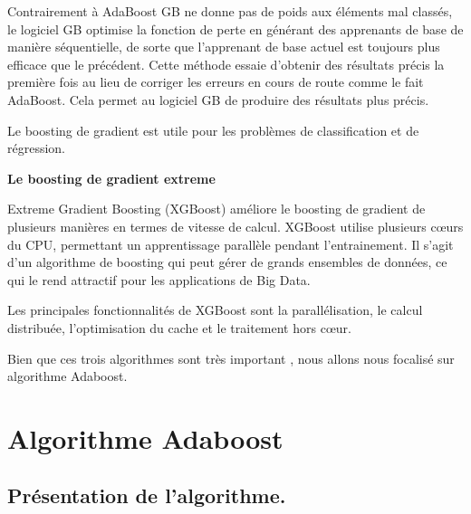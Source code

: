 \documentclass[french,a4paper,12pt]{article}
\begin{document}
\quad Contrairement à AdaBoost  GB ne donne pas de poids aux éléments mal classés,  le logiciel GB optimise la fonction de perte en générant des apprenants de base de manière séquentielle, de sorte que l'apprenant de base actuel est toujours plus efficace que le précédent. Cette méthode essaie d'obtenir des résultats précis la première fois au lieu de corriger les erreurs en cours de route comme le fait AdaBoost\citep{educa}. Cela permet au logiciel GB de produire des résultats plus précis.

\quad Le boosting de gradient est utile pour les problèmes de classification et de régression.




\textbf{Le boosting de gradient extreme}

\quad Extreme Gradient Boosting (XGBoost) améliore le boosting  de gradient de plusieurs manières en termes de vitesse de calcul\citep{mousa}. XGBoost utilise plusieurs cœurs du CPU, permettant un apprentissage parallèle pendant l’entrainement. Il s'agit d'un algorithme de boosting qui peut gérer de grands ensembles de données, ce qui le rend attractif pour les applications de Big Data. 

\quad Les principales fonctionnalités de XGBoost sont la parallélisation, le calcul distribuée, l'optimisation du cache et le traitement hors cœur.

\quad \quad Bien que ces trois algorithmes sont très important , nous allons nous focalisé sur algorithme Adaboost.

\section{Algorithme Adaboost}

\subsection{Présentation de l'algorithme. }
\end{document}
